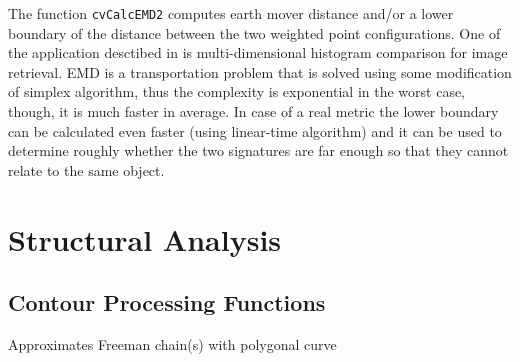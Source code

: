 The function \texttt{cvCalcEMD2} computes earth mover distance and/or
a lower boundary of the distance between the two weighted point
configurations. One of the application desctibed in \cite{RubnerSept98} is
multi-dimensional histogram comparison for image retrieval. EMD is a
transportation problem that is solved using some modification of simplex
algorithm, thus the complexity is exponential in the worst case, though,
it is much faster in average. In case of a real metric the lower boundary
can be calculated even faster (using linear-time algorithm) and it can
be used to determine roughly whether the two signatures are far enough
so that they cannot relate to the same object.

\section{Structural Analysis}

\subsection{Contour Processing Functions}

\label{ApproxChains}

Approximates Freeman chain(s) with polygonal curve


\begin{description}
\end{description}

